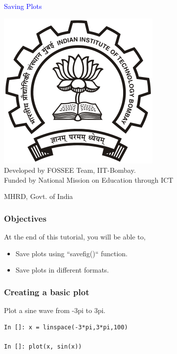 \documentclass[presentation]{beamer}
\title{}
\author{FOSSEE}
\date{2010-10-11 Mon}
\begin{document}
\begin{frame}

\begin{center}
\textcolor{blue}{Saving Plots}
\end{center}
\begin{center}
\includegraphics[scale=0.25]{../images/iitb-logo.png}\\
Developed by FOSSEE Team, IIT-Bombay. \\ 
Funded by National Mission on Education through ICT

MHRD, Govt. of India
\end{center}
\end{frame}
\begin{frame}
\frametitle{Objectives}
\label{sec-2}

  At the end of this tutorial, you will be able to,

\begin{itemize}
\item Save plots using ``savefig()`` function.
\item Save plots in different formats.
\end{itemize}
  
\end{frame}
\begin{frame}[fragile]
\frametitle{Creating a basic plot}
\label{sec-3}

  Plot a sine wave from -3pi to 3pi.
\lstset{language=Python}
\begin{lstlisting}
In []: x = linspace(-3*pi,3*pi,100)

In []: plot(x, sin(x))
\end{lstlisting}
\end{frame}
\end{document}
